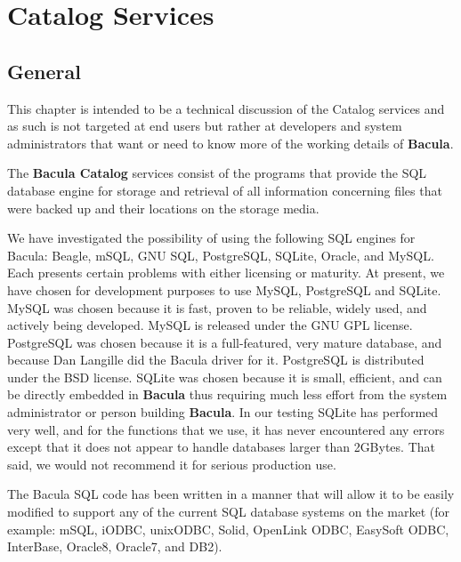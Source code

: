 
\chapter{Catalog Services}
\label{_ChapterStart30}

\section{General}

This chapter is intended to be a technical discussion of the Catalog services
and as such is not targeted at end users but rather at developers and system
administrators that want or need to know more of the working details of {\bf
Bacula}. 

The {\bf Bacula Catalog} services consist of the programs that provide the SQL
database engine for storage and retrieval of all information concerning files
that were backed up and their locations on the storage media. 

We have investigated the possibility of using the following SQL engines for
Bacula: Beagle, mSQL, GNU SQL, PostgreSQL, SQLite, Oracle, and MySQL. Each
presents certain problems with either licensing or maturity. At present, we
have chosen for development purposes to use MySQL, PostgreSQL and SQLite.
MySQL was chosen because it is fast, proven to be reliable, widely used, and
actively being developed. MySQL is released under the GNU GPL license.
PostgreSQL was chosen because it is a full-featured, very mature database, and
because Dan Langille did the Bacula driver for it. PostgreSQL is distributed
under the BSD license. SQLite was chosen because it is small, efficient, and
can be directly embedded in {\bf Bacula} thus requiring much less effort from
the system administrator or person building {\bf Bacula}. In our testing
SQLite has performed very well, and for the functions that we use, it has
never encountered any errors except that it does not appear to handle
databases larger than 2GBytes. That said, we would not recommend it for
serious production use.

The Bacula SQL code has been written in a manner that will allow it to be
easily modified to support any of the current SQL database systems on the
market (for example: mSQL, iODBC, unixODBC, Solid, OpenLink ODBC, EasySoft
ODBC, InterBase, Oracle8, Oracle7, and DB2). 

